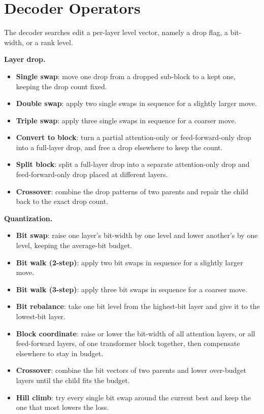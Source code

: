 \documentclass[10pt,twocolumn]{article}
\begin{document}
\section{Decoder Operators}
The decoder searches edit a per-layer level vector, namely a drop flag, a bit-width, or a rank level.

\textbf{Layer drop.}
\begin{itemize}[leftmargin=1.1em,itemsep=1pt,topsep=1pt]
\item \textbf{Single swap}: move one drop from a dropped sub-block to a kept one, keeping the drop count fixed.
\item \textbf{Double swap}: apply two single swaps in sequence for a slightly larger move.
\item \textbf{Triple swap}: apply three single swaps in sequence for a coarser move.
\item \textbf{Convert to block}: turn a partial attention-only or feed-forward-only drop into a full-layer drop, and free a drop elsewhere to keep the count.
\item \textbf{Split block}: split a full-layer drop into a separate attention-only drop and feed-forward-only drop placed at different layers.
\item \textbf{Crossover}: combine the drop patterns of two parents and repair the child back to the exact drop count.
\end{itemize}

\textbf{Quantization.}
\begin{itemize}[leftmargin=1.1em,itemsep=1pt,topsep=1pt]
\item \textbf{Bit swap}: raise one layer's bit-width by one level and lower another's by one level, keeping the average-bit budget.
\item \textbf{Bit walk (2-step)}: apply two bit swaps in sequence for a slightly larger move.
\item \textbf{Bit walk (3-step)}: apply three bit swaps in sequence for a coarser move.
\item \textbf{Bit rebalance}: take one bit level from the highest-bit layer and give it to the lowest-bit layer.
\item \textbf{Block coordinate}: raise or lower the bit-width of all attention layers, or all feed-forward layers, of one transformer block together, then compensate elsewhere to stay in budget.
\item \textbf{Crossover}: combine the bit vectors of two parents and lower over-budget layers until the child fits the budget.
\item \textbf{Hill climb}: try every single bit swap around the current best and keep the one that most lowers the loss.
\end{itemize}
\end{document}
